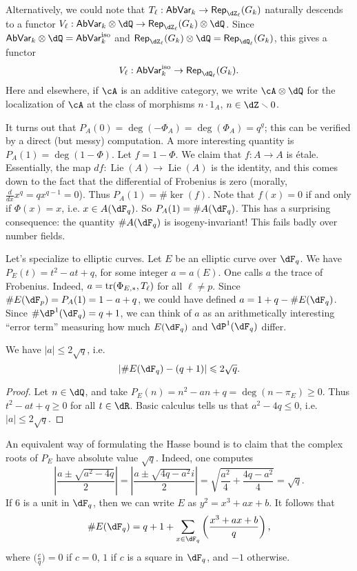 \documentclass{article}
\begin{document}
Alternatively, we could note that 
$T_\ell:\mathsf{AbVar}_k\to \mathsf{Rep}_{\dZ_\ell}(G_k)$ naturally descends to 
a functor 
$V_\ell:\mathsf{AbVar}_k\otimes\dQ\to \mathsf{Rep}_{\dZ_\ell}(G_k)\otimes\dQ$. 
Since $\mathsf{AbVar}_k\otimes\dQ=\mathsf{AbVar}_k^\text{iso}$ and 
$\mathsf{Rep}_{\dZ_\ell}(G_k)\otimes\dQ=\mathsf{Rep}_{\dQ_\ell}(G_k)$, this 
gives a functor 
\[
  V_\ell:\mathsf{AbVar}_k^\text{iso} \to \mathsf{Rep}_{\dQ_\ell}(G_k) \text{.}
\]
Here and elsewhere, if $\cA$ is an additive category, we write 
$\cA\otimes\dQ$ for the localization of $\cA$ at the class of morphisms 
$n\cdot 1_A$, $n\in \dZ\smallsetminus 0$.

It turns out that $P_A(0)=\deg(-\Phi_A)=\deg(\Phi_A)=q^g$; this can be verified 
by a direct (but messy) computation. A more interesting quantity is 
$P_A(1)=\deg(1-\Phi)$. Let $f=1-\Phi$. We claim that $f:A\to A$ is \'etale. 
Essentially, the map $d f:\operatorname{Lie}(A) \to \operatorname{Lie}(A)$ is 
the identity, and this comes down to the fact that the differential of 
Frobenius is zero (morally, $\frac{d}{dx}x^q=q x^{q-1}=0$). Thus 
$P_A(1)=\# \ker(f)$. Note that $f(x)=0$ if and only if $\Phi(x)=x$, i.e. 
$x\in A(\dF_q)$. So $P_A(1)=\#A(\dF_q)$. This has a surprising consequence: the 
quantity $\# A(\dF_q)$ is isogeny-invariant! This fails badly over number 
fields. 

Let's specialize to elliptic curves. Let $E$ be an elliptic curve over 
$\dF_q$. We have $P_E(t)=t^2-a t+q$, for some integer $a=a(E)$. One calls $a$ 
the trace of Frobenius. Indeed, $a=\operatorname{tr}(\Phi_{E,\ast},T_\ell)$ for 
all $\ell\ne p$. Since $\# E(\dF_p)=P_A(1)=1-a+q$, we could have defined 
$a=1+q-\# E(\dF_q)$. Since $\# \dP^1(\dF_q)=q+1$, we can think of $a$ as an 
arithmetically interesting ``error term'' measuring how much $E(\dF_q)$ and 
$\dP^1(\dF_q)$ differ. 

\begin{theorem}
We have $|a| \leqslant 2\sqrt q$, i.e. 
\[
  | \# E(\dF_q) - (q+1)| \leqslant 2\sqrt q \text{.}
\]
\end{theorem}
\begin{proof}
Let $n\in\dQ$, and take $P_E(n)=n^2-a n+q = \deg(n-\pi_E)\geqslant 0$. Thus 
$t^2-a t+q\geqslant 0$ for all $t\in \dR$. Basic calculus tells us that 
$a^2-4 q\leqslant 0$, i.e. $|a|\leqslant 2\sqrt q$. 
\end{proof}

An equivalent way of formulating the Hasse bound is to claim that the complex 
roots of $P_E$ have absolute value $\sqrt q$. Indeed, one computes 
\[
  \left|\frac{a\pm \sqrt{a^2-4 q}}{2}\right| 
    = \left|\frac{a\pm \sqrt{4 q-a^2} i}{2}\right| 
    = \sqrt{\frac{a^2}{4} + \frac{4 q-a^2}{4}}
    = \sqrt q \text{.}
\]
If $6$ is a unit in $\dF_q$, then we can write $E$ as $y^2=x^3+a x+b$. It 
follows that 
\[
  \# E(\dF_q) = q+1 + \sum_{x\in \dF_q} \left(\frac{x^3+a x+b}{q}\right) \text{,}
\]
where $\big(\frac{c}{q}\big)=0$ if $c=0$, $1$ if $c$ is a square in $\dF_q$, 
and $-1$ otherwise. 
\end{document}
